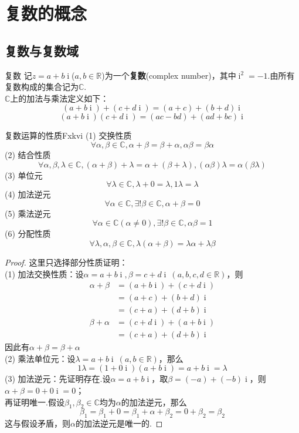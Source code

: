 \documentclass[lang=cn, zihao=4.5]{elegantbook}
\newcommand{\R}{\mathbb{R}}
\newcommand{\C}{\mathbb{C}}
\DeclareMathOperator{\ic}{i}
\begin{document}
\section{复数的概念}

\subsection{复数与复数域}

\begin{definition}{复数}
	记$z=a+b\ic $($a,b \in \R$)为一个\textbf{复数}(complex number)，其中$\ic ^2=-1$.由所有复数构成的集合记为$\C$. \\
	$\C$上的加法与乘法定义如下：
	$$(a+b\ic ) + (c+d\ic ) = (a+c) + (b+d)\ic $$
	$$(a+b\ic )(c+d\ic ) = (ac-bd) + (ad+bc)\ic $$
\end{definition}

\begin{proposition}{复数运算的性质}{Fxkvi}
	(1) 交换性质$$\forall \alpha , \beta \in \C , \alpha + \beta = \beta + \alpha , \alpha \beta = \beta \alpha$$
	(2) 结合性质$$\forall \alpha , \beta , \lambda \in \C , (\alpha + \beta) + \lambda = \alpha + (\beta + \lambda) , (\alpha \beta) \lambda = \alpha (\beta \lambda)$$
	(3) 单位元$$\forall \lambda \in \C , \lambda + 0 = \lambda , 1 \lambda = \lambda$$
	(4) 加法逆元$$\forall \alpha \in \C , \exists ! \beta \in \C , \alpha + \beta = 0$$
	(5) 乘法逆元$$\forall \alpha \in \C (\alpha \neq 0) , \exists ! \beta \in \C , \alpha \beta = 1$$
	(6) 分配性质$$\forall \lambda , \alpha , \beta \in \C , \lambda (\alpha + \beta) = \lambda \alpha + \lambda \beta$$
\end{proposition}
\begin{proof}
	这里只选择部分性质证明： \\
	(1) 加法交换性质：设$\alpha = a+b\ic , \beta = c+d\ic ~(a,b,c,d \in \R )$，则
	\begin{align*}
		\alpha + \beta &= (a+b\ic ) + (c+d\ic ) \\
		&= (a+c) + (b+d)\ic \\
		&= (c+a) + (d+b)\ic \\
		\beta + \alpha &= (c+d\ic ) + (a+b\ic ) \\
		&= (c+a) + (d+b)\ic
	\end{align*}
	因此有$\alpha + \beta = \beta + \alpha$ \\
	(2) 乘法单位元：设$\lambda = a+b\ic ~ (a,b \in \R )$，那么$$1 \lambda = (1+0\ic )(a+b\ic ) = a + b\ic = \lambda$$
	(3) 加法逆元：先证明存在.设$\alpha = a+b\ic $，取$\beta = (-a) + (-b)\ic $，则$\alpha + \beta = 0+0\ic = 0$；\\
	再证明唯一.假设$\beta _1, \beta _2 \in \C $均为$\alpha$的加法逆元，那么$$\beta _1 = \beta _1 + 0 = \beta _1 + \alpha + \beta _2 = 0 + \beta _2 = \beta _2$$
	这与假设矛盾，则$\alpha$的加法逆元是唯一的.
\end{proof}
\end{document}
